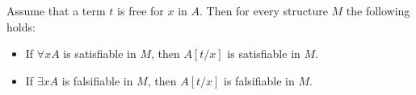 \begin{lem}
\label{lem:TermSubstitute}
Assume that a term $t$ is free for $x$ in $A$.
Then for every structure $M$ the following holds:
\begin{itemize}
\item
If $\forall x A$ is satisfiable in $M$, then $A[t/x]$ is satisfiable in $M$.
\item
If $\exists x A$ is falsifiable in $M$, then $A[t/x]$ is falsifiable in $M$.
\end{itemize}
\end{lem}